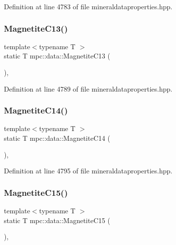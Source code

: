 Definition at line 4783 of file mineraldataproperties.\+hpp.

\mbox{\label{namespacempc_1_1data_a2a3aa8d2256b3f5e09e3de5b143b6096}} 
\subsubsection{\texorpdfstring{Magnetite\+C13()}{MagnetiteC13()}}
{\footnotesize\ttfamily template$<$typename T $>$ \\
static T mpc\+::data\+::\+Magnetite\+C13 (\begin{DoxyParamCaption}{ }\end{DoxyParamCaption})\hspace{0.3cm}{\ttfamily [inline]}, {\ttfamily [static]}}



Definition at line 4789 of file mineraldataproperties.\+hpp.

\mbox{\label{namespacempc_1_1data_afab9f24026421a9d1d4da2d43df15010}} 
\subsubsection{\texorpdfstring{Magnetite\+C14()}{MagnetiteC14()}}
{\footnotesize\ttfamily template$<$typename T $>$ \\
static T mpc\+::data\+::\+Magnetite\+C14 (\begin{DoxyParamCaption}{ }\end{DoxyParamCaption})\hspace{0.3cm}{\ttfamily [inline]}, {\ttfamily [static]}}



Definition at line 4795 of file mineraldataproperties.\+hpp.

\mbox{\label{namespacempc_1_1data_af3b0caf8e5d242078154d5f3bb7607de}} 
\subsubsection{\texorpdfstring{Magnetite\+C15()}{MagnetiteC15()}}
{\footnotesize\ttfamily template$<$typename T $>$ \\
static T mpc\+::data\+::\+Magnetite\+C15 (\begin{DoxyParamCaption}{ }\end{DoxyParamCaption})\hspace{0.3cm}{\ttfamily [inline]}, {\ttfamily [static]}}



